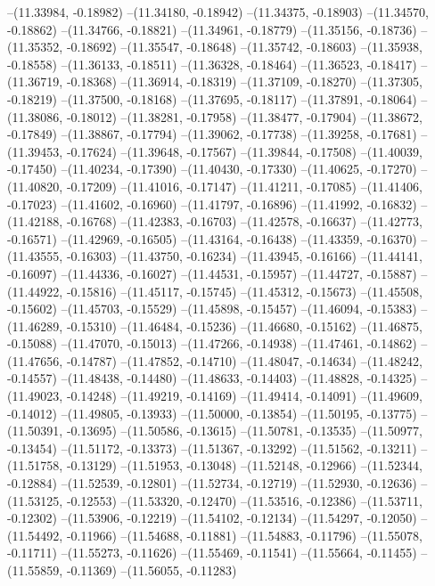 --(11.33984, -0.18982)
--(11.34180, -0.18942)
--(11.34375, -0.18903)
--(11.34570, -0.18862)
--(11.34766, -0.18821)
--(11.34961, -0.18779)
--(11.35156, -0.18736)
--(11.35352, -0.18692)
--(11.35547, -0.18648)
--(11.35742, -0.18603)
--(11.35938, -0.18558)
--(11.36133, -0.18511)
--(11.36328, -0.18464)
--(11.36523, -0.18417)
--(11.36719, -0.18368)
--(11.36914, -0.18319)
--(11.37109, -0.18270)
--(11.37305, -0.18219)
--(11.37500, -0.18168)
--(11.37695, -0.18117)
--(11.37891, -0.18064)
--(11.38086, -0.18012)
--(11.38281, -0.17958)
--(11.38477, -0.17904)
--(11.38672, -0.17849)
--(11.38867, -0.17794)
--(11.39062, -0.17738)
--(11.39258, -0.17681)
--(11.39453, -0.17624)
--(11.39648, -0.17567)
--(11.39844, -0.17508)
--(11.40039, -0.17450)
--(11.40234, -0.17390)
--(11.40430, -0.17330)
--(11.40625, -0.17270)
--(11.40820, -0.17209)
--(11.41016, -0.17147)
--(11.41211, -0.17085)
--(11.41406, -0.17023)
--(11.41602, -0.16960)
--(11.41797, -0.16896)
--(11.41992, -0.16832)
--(11.42188, -0.16768)
--(11.42383, -0.16703)
--(11.42578, -0.16637)
--(11.42773, -0.16571)
--(11.42969, -0.16505)
--(11.43164, -0.16438)
--(11.43359, -0.16370)
--(11.43555, -0.16303)
--(11.43750, -0.16234)
--(11.43945, -0.16166)
--(11.44141, -0.16097)
--(11.44336, -0.16027)
--(11.44531, -0.15957)
--(11.44727, -0.15887)
--(11.44922, -0.15816)
--(11.45117, -0.15745)
--(11.45312, -0.15673)
--(11.45508, -0.15602)
--(11.45703, -0.15529)
--(11.45898, -0.15457)
--(11.46094, -0.15383)
--(11.46289, -0.15310)
--(11.46484, -0.15236)
--(11.46680, -0.15162)
--(11.46875, -0.15088)
--(11.47070, -0.15013)
--(11.47266, -0.14938)
--(11.47461, -0.14862)
--(11.47656, -0.14787)
--(11.47852, -0.14710)
--(11.48047, -0.14634)
--(11.48242, -0.14557)
--(11.48438, -0.14480)
--(11.48633, -0.14403)
--(11.48828, -0.14325)
--(11.49023, -0.14248)
--(11.49219, -0.14169)
--(11.49414, -0.14091)
--(11.49609, -0.14012)
--(11.49805, -0.13933)
--(11.50000, -0.13854)
--(11.50195, -0.13775)
--(11.50391, -0.13695)
--(11.50586, -0.13615)
--(11.50781, -0.13535)
--(11.50977, -0.13454)
--(11.51172, -0.13373)
--(11.51367, -0.13292)
--(11.51562, -0.13211)
--(11.51758, -0.13129)
--(11.51953, -0.13048)
--(11.52148, -0.12966)
--(11.52344, -0.12884)
--(11.52539, -0.12801)
--(11.52734, -0.12719)
--(11.52930, -0.12636)
--(11.53125, -0.12553)
--(11.53320, -0.12470)
--(11.53516, -0.12386)
--(11.53711, -0.12302)
--(11.53906, -0.12219)
--(11.54102, -0.12134)
--(11.54297, -0.12050)
--(11.54492, -0.11966)
--(11.54688, -0.11881)
--(11.54883, -0.11796)
--(11.55078, -0.11711)
--(11.55273, -0.11626)
--(11.55469, -0.11541)
--(11.55664, -0.11455)
--(11.55859, -0.11369)
--(11.56055, -0.11283)
